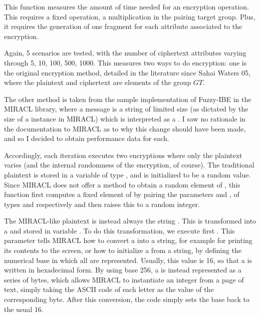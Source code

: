 \documentclass{article}
\begin{document}
This function measures the amount of time needed for an encryption operation. This requires a fixed operation, a multiplication in the pairing target group. Plus, it requires the generation of one fragment for each attribute associated to the encryption. 

Again, 5 scenarios are tested, with the number of ciphertext attributes varying through 5, 10, 100, 500, 1000. This measures two ways to do encryption: one is the original encryption method, detailed in the literature since Sahai Waters 05, where the plaintext and ciphertext are elements of the group $GT$. 

The other method is taken from the sample implementation of Fuzzy-IBE in the MIRACL library, where a message is a string of limited size (as dictated by the size of a \cBig instance in MIRACL) which is interpreted as a \cBig. I saw no rationale in the documentation to MIRACL as to why this change should have been made, and so I decided to obtain performance data for each.

Accordingly, each iteration executes two encryptions where only the plaintext varies (and the internal randomness of the encryption, of course). The traditional plaintext is stored in a variable  of type , and is initialized to be a random value. Since MIRACL does not offer a method to obtain a random element of , this function first computes a fixed element of  by pairing the parameters  and , of types  and  respectively and then raises this to a random \cBig integer. 

The MIRACL-like plaintext is instead always the string . This is transformed into a \cBig and stored in variable . To do this transformation, we execute first . This parameter tells MIRACL how to convert a \cBig into a string, for example for printing its contents to the screen, or how to initialize a \cBig from a string, by defining the numerical base in which all \cBig are represented. Usually, this value is 16, so that a \cBig is written in hexadecimal form. By using base 256, a \cBig is instead represented as a series of bytes, which allows MIRACL to instantiate an integer from a page of text, simply taking the ASCII code of each letter as the value of the corresponding byte. 
After this conversion, the code simply sets the base back to the usual 16.

\subsection{}
\end{document}
